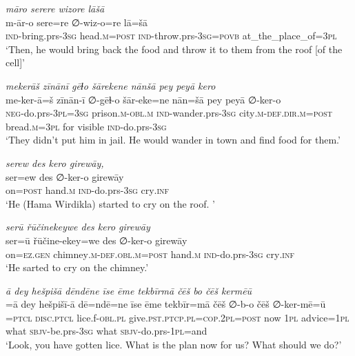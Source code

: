 \ea \label{BP.145}
\textit{māro serere wizore lāšā} \\ 
\gll m-ār-o sere=re ∅-wiz-o=re lā=šā \\ 
 \textsc{ind-}bring.prs\textsc{-3sg} head\textsc{.m}\textsc{=\textsc{post}} \textsc{ind-}throw.prs\textsc{-3sg}\textsc{=\textsc{povb}} at\_the\_place\_of\textsc{=3pl} \\ 
\glt `Then, he would bring back the food and throw it to them from the roof [of the cell]'
\z 
 
\ea \label{BP.148}
\textit{mekerāš zīnānī gēɫo šārekene nānšā pey peyā kero} \\ 
\gll me-ker-ā=š zīnān-ī ∅-gēɫ-o šār-eke=ne nān=šā pey peyā ∅-ker-o \\ 
 \textsc{neg-}do.prs\textsc{-3pl}\textsc{=3sg} prison\textsc{.m}\textsc{-obl}\textsc{.m} \textsc{ind-}wander.prs\textsc{-3sg} city\textsc{.m}\textsc{-def}\textsc{.dir}\textsc{.m}\textsc{=\textsc{post}} bread\textsc{.m}\textsc{=3pl} for visible \textsc{ind-}do.prs\textsc{-3sg} \\ 
\glt `They didn’t put him in jail. He would wander in town and find food for them.'
\z 
 
\ea \label{BP.152}
\textit{serew des kero girewāy,} \\ 
\gll ser=ew des ∅-ker-o girewāy \\ 
 on\textsc{=\textsc{post}} hand\textsc{.m} \textsc{ind-}do.prs\textsc{-3sg} cry\textsc{.inf} \\ 
\glt `He (Hama Wirdikla) started to cry on the roof. '
\z 
 
\ea \label{BP.153}
\textit{serū řūčinekeywe des kero girewāy} \\ 
\gll ser=ū řūčine-ekey=we des ∅-ker-o girewāy \\ 
 on\textsc{=ez.gen} chimney\textsc{.m}\textsc{-def}\textsc{.obl}\textsc{.m}\textsc{=\textsc{post}} hand\textsc{.m} \textsc{ind-}do.prs\textsc{-3sg} cry\textsc{.inf} \\ 
\glt `He sarted to cry on the chimney.'
\z 
 
\ea \label{BP.156}
\textit{ā dey hešpišā dēndēne īse ēme tekbīrmā čēš bo čēš kermēū} \\ 
\gll =ā dey hešpišī-ā dē=ndē=ne īse ēme tekbīr=mā čēš ∅-b-o čēš ∅-ker-mē=ū \\ 
=\textsc{ptcl} \textsc{disc.ptcl} lice.f\textsc{-obl}\textsc{.pl} give\textsc{.pst}\textsc{.ptcp}\textsc{.pl}\textsc{=cop}.\textsc{2pl}\textsc{=\textsc{post}} now \textsc{1pl} advice\textsc{=\textsc{1pl}} what \textsc{sbjv-}be.prs\textsc{-3sg} what \textsc{sbjv-}do.prs\textsc{-\textsc{1pl}}=and \\ 
\glt `Look, you have gotten lice. What is the plan now for us? What should we do?'
\z 
 
